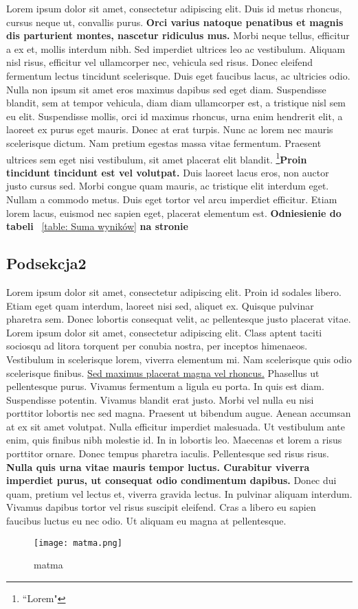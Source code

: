 \documentclass[12pt,a4paper]{article}
\begin{document}
	Lorem ipsum dolor sit amet, consectetur adipiscing elit. Duis id metus rhoncus, cursus neque ut, convallis purus. \textbf{Orci varius natoque penatibus et magnis dis parturient montes, nascetur ridiculus mus.} Morbi neque tellus, efficitur a ex et, mollis interdum nibh. Sed imperdiet ultrices leo ac vestibulum. Aliquam nisl risus, efficitur vel ullamcorper nec, vehicula sed risus. Donec eleifend fermentum lectus tincidunt scelerisque. Duis eget faucibus lacus, ac ultricies odio. Nulla non ipsum sit amet eros maximus dapibus sed eget diam. Suspendisse blandit, sem at tempor vehicula, diam diam ullamcorper est, a tristique nisl sem eu elit. Suspendisse mollis, orci id maximus rhoncus, urna enim hendrerit elit, a laoreet ex purus eget mauris. Donec at erat turpis. Nunc ac lorem nec mauris scelerisque dictum. Nam pretium egestas massa vitae fermentum. Praesent ultrices sem eget nisi vestibulum, sit amet placerat elit blandit. \footnote{``Lorem"}\textbf{Proin tincidunt tincidunt est vel volutpat.} Duis laoreet lacus eros, non auctor justo cursus sed. Morbi congue quam mauris, ac tristique elit interdum eget. Nullam a commodo metus. Duis eget tortor vel arcu imperdiet efficitur. Etiam lorem lacus, euismod nec sapien eget, placerat elementum est.  \textbf{Odniesienie do tabeli} ~\ref{table: Suma wyników} \textbf{na stronie} ~\pageref{table: Suma wyników} 

	
	\subsection{Podsekcja2}
	Lorem ipsum dolor sit amet, consectetur adipiscing elit. Proin id sodales libero. Etiam eget quam interdum, laoreet nisi sed, aliquet ex. Quisque pulvinar pharetra sem. Donec lobortis consequat velit, ac pellentesque justo placerat vitae. Lorem ipsum dolor sit amet, consectetur adipiscing elit. Class aptent taciti sociosqu ad litora torquent per conubia nostra, per inceptos himenaeos. Vestibulum in scelerisque lorem, viverra elementum mi. Nam scelerisque quis odio scelerisque finibus. \underline{Sed maximus placerat magna vel rhoncus.} Phasellus ut pellentesque purus. Vivamus fermentum a ligula eu porta. In quis est diam. Suspendisse potentin. Vivamus blandit erat justo. Morbi vel nulla eu nisi porttitor lobortis nec sed magna. Praesent ut bibendum augue. Aenean accumsan at ex sit amet volutpat. Nulla efficitur imperdiet malesuada. Ut vestibulum ante enim, quis finibus nibh molestie id. In in lobortis leo. Maecenas et lorem a risus porttitor ornare. Donec tempus pharetra iaculis. Pellentesque sed risus risus.\textbf{ Nulla quis urna vitae mauris tempor luctus. Curabitur viverra imperdiet purus, ut consequat odio condimentum dapibus.} Donec dui quam, pretium vel lectus et, viverra gravida lectus. In pulvinar aliquam interdum. Vivamus dapibus tortor vel risus suscipit eleifend. Cras a libero eu sapien faucibus luctus eu nec odio. Ut aliquam eu magna at pellentesque. 
	\begin{figure}[H]
		\centering
		\texttt{[image: matma.png]}
		\caption{matma}
		\label{fig: matma}
	\end{figure}
\end{document}

